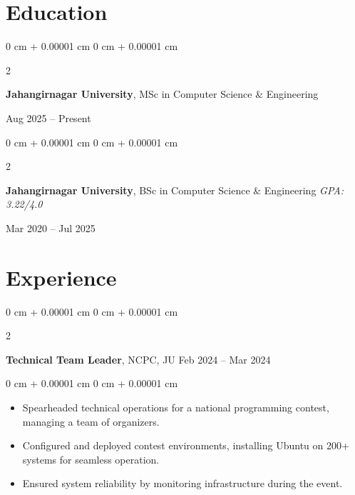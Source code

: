 \documentclass[10pt, letterpaper]{article}
\newenvironment{highlights}{
	\begin{itemize}[
		topsep=0.10 cm,
		parsep=0.10 cm,
		partopsep=0pt,
		itemsep=0pt,
		leftmargin=0 cm + 10pt
		]
	}{
	\end{itemize}
} %
\newenvironment{highlightsforbulletentries}{
	\begin{itemize}[
		topsep=0.10 cm,
		parsep=0.10 cm,
		partopsep=0pt,
		itemsep=0pt,
		leftmargin=10pt
		]
	}{
	\end{itemize}
} %
\newenvironment{onecolentry}{
	\begin{adjustwidth}{
			0 cm + 0.00001 cm
		}{
			0 cm + 0.00001 cm
		}
	}{
	\end{adjustwidth}
} %
\newenvironment{twocolentry}[2][]{
	\onecolentry
	\def\secondColumn{#2}
	\setcolumnwidth{\fill, 4.5 cm}
	\begin{paracol}{2}
	}{
		\switchcolumn \raggedleft \secondColumn
	\end{paracol}
	\endonecolentry
} %
\begin{document}
	
	\section{Education}
	
	\begin{twocolentry}{
			Aug 2025 – Present
		}
		\textbf{Jahangirnagar University}, MSc in Computer Science \& Engineering
	\end{twocolentry}
	
	\vspace{0.2 cm}
	
	\begin{twocolentry}{
			Mar 2020 – Jul 2025
		}
		\textbf{Jahangirnagar University}, BSc in Computer Science \& Engineering \hfill \textit{GPA: 3.22/4.0}
	\end{twocolentry}
	
	
	
	
	\section{Experience}
	
	
	
	
	\begin{twocolentry}{
			Feb 2024 – Mar 2024
		}
		\textbf{Technical Team Leader}, NCPC, JU \end{twocolentry}
	
	\vspace{0.10 cm}
	\begin{onecolentry}
		\begin{highlights}
			\item Spearheaded technical operations for a national programming contest, managing a team of organizers.
			\item Configured and deployed contest environments, installing Ubuntu on 200+ systems for seamless operation.
			\item Ensured system reliability by monitoring infrastructure during the event.
		\end{highlights}
	\end{onecolentry}
	
\end{document}
